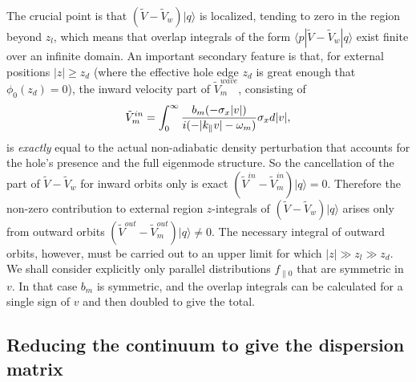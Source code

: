 \documentclass{jpp}
\def\ket#1{|#1\rangle}
\def\bra#1{\langle#1}
\begin{document}
The crucial point is that $(\tilde{V}-\tilde{V}_{w})\ket{q}$ is
localized, tending to zero in the region beyond $z_l$, which means
that overlap integrals of the form
$\bra{p}|\tilde{V}-\tilde{V}_{w}\ket{q}$ exist finite over an infinite
domain. An important secondary feature is that, for external positions
$|z|\ge z_d$ (where the effective hole edge $z_d$ is great enough that
$\phi_0(z_d)=0$), the inward velocity part of $\tilde V_m^{wave}$,
consisting of
\begin{equation}
  \label{inward}
  \tilde V_m^{in}= \int_{0}^\infty { b_m(-\sigma_x|v|) \over
    i(-|k_\parallel v|-\omega_m)}\sigma_x d|v|,
\end{equation}
is \emph{exactly} equal to the actual non-adiabatic density
perturbation that accounts for the hole's presence and the full
eigenmode structure. So the cancellation of the part of
$\tilde V-\tilde V_w$ for inward orbits only is exact
$(\tilde V^{in}-\tilde V_m^{in})\ket{q}=0$. Therefore the non-zero
contribution to external region $z$-integrals of
$(\tilde V-\tilde V_w)\ket{q}$ arises only from outward orbits
$(\tilde V^{out}-\tilde V_m^{out})\ket{q}\not=0$. The necessary
integral of outward orbits, however, must be carried out to an upper limit for
which $|z|\gg z_l\gg z_d$. We shall consider explicitly only parallel
distributions $f_{\parallel0}$ that are symmetric in $v$. In that case
$b_m$ is symmetric, and the overlap integrals can be calculated for a
single sign of $v$ and then doubled to give the total.


\subsection{Reducing the continuum to give the dispersion matrix}
\end{document}

